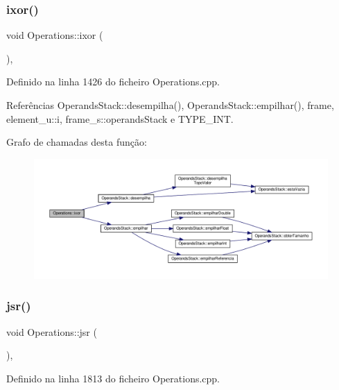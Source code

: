 \subsubsection{\texorpdfstring{ixor()}{ixor()}}
{\footnotesize\ttfamily void Operations\+::ixor (\begin{DoxyParamCaption}{ }\end{DoxyParamCaption})\hspace{0.3cm}{\ttfamily [static]}, {\ttfamily [private]}}



Definido na linha 1426 do ficheiro Operations.\+cpp.



Referências Operands\+Stack\+::desempilha(), Operands\+Stack\+::empilhar(), frame, element\+\_\+u\+::i, frame\+\_\+s\+::operands\+Stack e T\+Y\+P\+E\+\_\+\+I\+NT.

Grafo de chamadas desta função\+:
\nopagebreak
\begin{figure}[H]
\begin{center}
\leavevmode
\includegraphics[width=350pt]{classOperations_abd0ce3453623b677de3af1f05bcf4b0b_cgraph}
\end{center}
\end{figure}
\mbox{\label{classOperations_a63c3ab8fef60a8a19ee336cb3d86f9aa}} 
\subsubsection{\texorpdfstring{jsr()}{jsr()}}
{\footnotesize\ttfamily void Operations\+::jsr (\begin{DoxyParamCaption}{ }\end{DoxyParamCaption})\hspace{0.3cm}{\ttfamily [static]}, {\ttfamily [private]}}



Definido na linha 1813 do ficheiro Operations.\+cpp.



